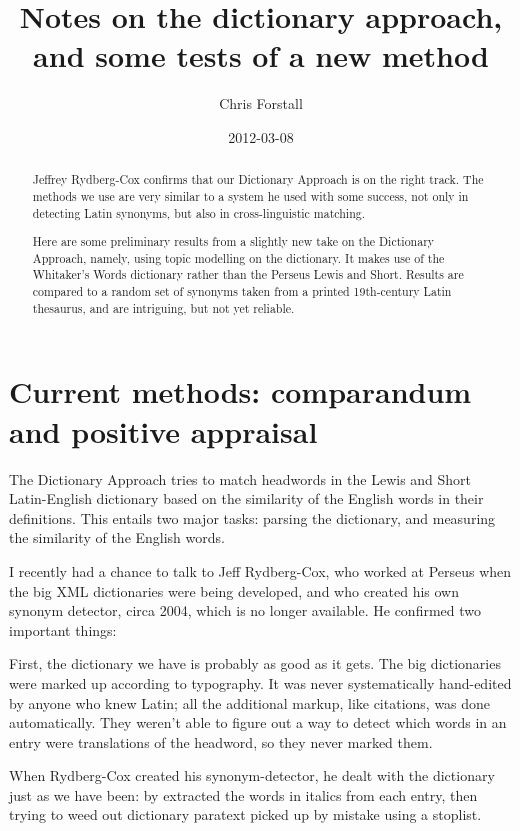 \documentclass[]{article}
\title{Notes on the dictionary approach, and some tests of a new method}
\author{Chris Forstall}
\date{2012-03-08}
\begin{document}
	
	\setmainfont{Arial}
	
	\maketitle


	\begin{abstract}
		
		Jeffrey Rydberg-Cox confirms that our Dictionary Approach is on the right track.  The methods we use are very similar to a system he used with some success, not only in detecting Latin synonyms, but also in cross-linguistic matching.

		Here are some preliminary results from a slightly new take on the Dictionary Approach, namely, using topic modelling on the dictionary.  It makes use of the Whitaker's Words dictionary rather than the Perseus Lewis and Short.  Results are compared to a random set of synonyms taken from a printed 19th-century Latin thesaurus, and are intriguing, but not yet reliable.

	\end{abstract}

	\section{Current methods: comparandum and positive appraisal}

		The Dictionary Approach tries to match headwords in the Lewis and Short Latin-English dictionary based on the similarity of the English words in their definitions.  This entails two major tasks: parsing the dictionary, and measuring the similarity of the English words.

		I recently had a chance to talk to Jeff Rydberg-Cox, who worked at Perseus when the big XML dictionaries were being developed, and who created his own synonym detector, circa 2004, which is no longer available.  He confirmed two important things:

		First, the dictionary we have is probably as good as it gets.  The big dictionaries were marked up according to typography.  It was never systematically hand-edited by anyone who knew Latin; all the additional markup, like citations, was done automatically.  They weren't able to figure out a way to detect which words in an entry were translations of the headword, so they never marked them.

		When Rydberg-Cox created his synonym-detector, he dealt with the dictionary just as we have been: by extracted the words in italics from each entry, then trying to weed out dictionary paratext picked up by mistake using a stoplist.
\end{document}
